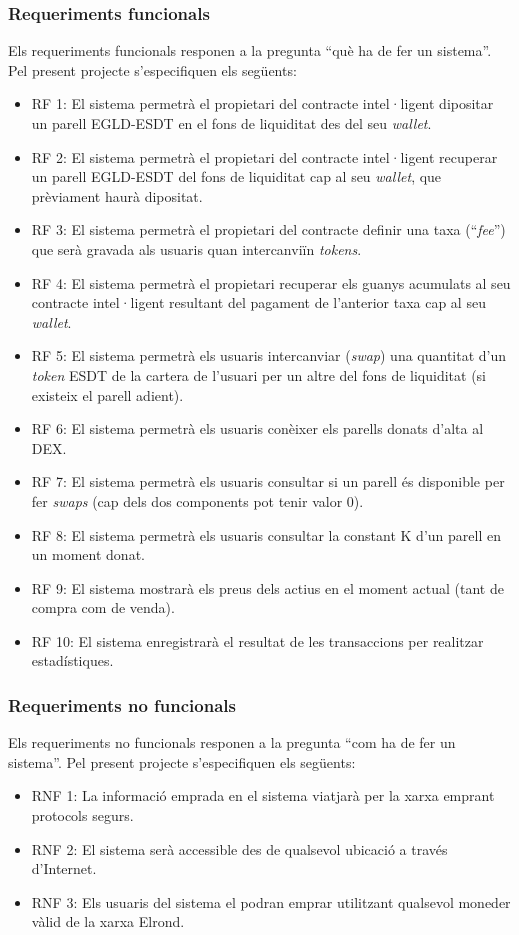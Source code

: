 \documentclass[11pt,a4paper]{article}
\begin{document}
\subsubsection{Requeriments funcionals}\label{subsub:rfun}
Els requeriments funcionals responen a la pregunta ``què ha de fer un sistema''. Pel present projecte s'especifiquen els següents:
\begin{itemize}
\item RF 1: El sistema permetrà el propietari del contracte intel·ligent dipositar un parell EGLD-ESDT en el fons de liquiditat des del seu \textit{wallet}.
\item RF 2: El sistema permetrà el propietari del contracte intel·ligent recuperar un parell EGLD-ESDT del fons de liquiditat cap al seu \textit{wallet}, que prèviament haurà dipositat.
\item RF 3: El sistema permetrà el propietari del contracte definir una taxa (``\textit{fee}'') que serà gravada als usuaris quan intercanviïn \textit{tokens}.
\item RF 4: El sistema permetrà el propietari recuperar els guanys acumulats al seu contracte intel·ligent resultant del pagament de l'anterior taxa cap al seu \textit{wallet}.
\item RF 5: El sistema permetrà els usuaris intercanviar (\textit{swap}) una quantitat d'un \textit{token} ESDT de la cartera de l'usuari per un altre del fons de liquiditat (si existeix el parell adient).
\item RF 6: El sistema permetrà els usuaris conèixer els parells donats d'alta al DEX.
\item RF 7: El sistema permetrà els usuaris consultar si un parell és disponible per fer \textit{swaps} (cap dels dos components pot tenir valor 0).
\item RF 8: El sistema permetrà els usuaris consultar la constant K d'un parell en un moment donat.
\item RF 9: El sistema mostrarà els preus dels actius en el moment actual (tant de compra com de venda).
\item RF 10: El sistema enregistrarà el resultat de les transaccions per realitzar estadístiques.
\end{itemize}

\subsubsection{Requeriments no funcionals}\label{subsub:rnofun}
Els requeriments no funcionals responen a la pregunta ``com ha de fer un sistema''. Pel present projecte s'especifiquen els següents:
\begin{itemize}
\item RNF 1: La informació emprada en el sistema viatjarà per la xarxa emprant protocols segurs.
\item RNF 2: El sistema serà accessible des de qualsevol ubicació a través d'Internet.
\item RNF 3: Els usuaris del sistema el podran emprar utilitzant qualsevol moneder vàlid de la xarxa Elrond.
\end{itemize}
\end{document}
